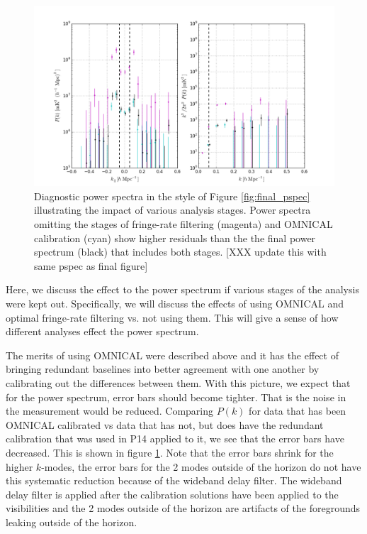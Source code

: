 \documentclass[twocolumn,numberedappendix]{emulateapj} \shorttitle{PSA64}
\begin{document}
\begin{figure}[t!]\centering
\includegraphics[width=2\columnwidth]{plots/pspec_comparison.png}
\caption{Diagnostic power spectra in the style of Figure \ref{fig:final_pspec}
illustrating the impact of various analysis stages.
Power spectra omitting the stages of fringe-rate filtering (magenta) and 
OMNICAL calibration (cyan) show higher residuals than the the final power spectrum
(black) that includes both stages.
[XXX update this with same pspec as final figure]
}\label{fig:pspec_comp}
\end{figure}

Here, we discuss the effect to the power spectrum if various stages of the
analysis were kept out. Specifically, we will discuss the effects of using
OMNICAL and optimal fringe-rate filtering vs. not using them. This will give a
sense of how different analyses effect the power spectrum.

The merits of using OMNICAL were described above and it has the effect of
bringing redundant baselines into better agreement with one another by
calibrating out the differences between them. With this picture, we expect
that for the power spectrum, error bars should become tighter. That is the
noise in the measurement would be reduced. Comparing $P(k)$ for data that has
been OMNICAL calibrated vs data that has not, but does have the redundant
calibration that was used in P14 applied to it, we see that
the error bars have decreased. This is shown in figure \ref{fig:pspec_comp}.
Note that the error bars shrink for the higher $k$-modes, the error bars for the
2 modes outside of the horizon do not have this systematic reduction because of
the wideband delay filter. The wideband delay filter is applied after the
calibration solutions have been applied to the visibilities and the 2 modes
outside of the horizon are artifacts of the foregrounds leaking outside of the
horizon. 
\end{document}
